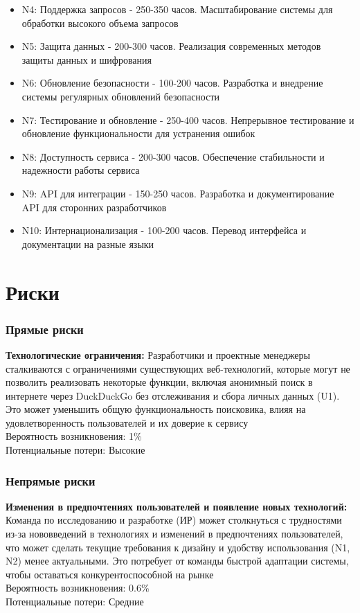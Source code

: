 \documentclass[12pt,a4paper]{article}
\begin{document}
\begin{itemize}
    \item N4: Поддержка запросов - 250-350 часов. Масштабирование системы для обработки высокого объема запросов
    \item N5: Защита данных - 200-300 часов. Реализация современных методов защиты данных и шифрования
    \item N6: Обновление безопасности - 100-200 часов. Разработка и внедрение системы регулярных обновлений безопасности
    \item N7: Тестирование и обновление - 250-400 часов. Непрерывное тестирование и обновление функциональности для устранения ошибок
    \item N8: Доступность сервиса - 200-300 часов. Обеспечение стабильности и надежности работы сервиса
    \item N9: API для интеграции - 150-250 часов. Разработка и документирование API для сторонних разработчиков
    \item N10: Интернационализация - 100-200 часов. Перевод интерфейса и документации на разные языки
\end{itemize}
\part*{Риски}
\section{Прямые риски}
\textbf{Технологические ограничения:} Разработчики и проектные менеджеры сталкиваются с ограничениями существующих веб-технологий, которые могут не позволить реализовать некоторые функции, включая анонимный поиск в интернете через DuckDuckGo без отслеживания и сбора личных данных (U1). Это может уменьшить общую функциональность поисковика, влияя на удовлетворенность пользователей и их доверие к сервису
\\ \hfill\break
Вероятность возникновения: 1\% \\
Потенциальные потери: Высокие

\section{Непрямые риски}
\textbf{Изменения в предпочтениях пользователей и появление новых технологий:} Команда по исследованию и разработке (ИР) может столкнуться с трудностями из-за нововведений в технологиях и изменений в предпочтениях пользователей, что может сделать текущие требования к дизайну и удобству использования (N1, N2) менее актуальными. Это потребует от команды быстрой адаптации системы, чтобы оставаться конкурентоспособной на рынке
\\ \hfill\break
Вероятность возникновения: 0.6\% \\
Потенциальные потери: Средние
\end{document}
